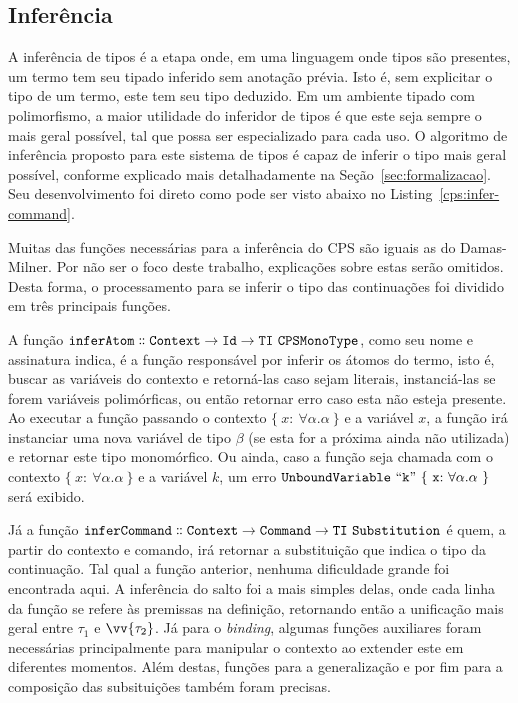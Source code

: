 \subsection{Inferência}\label{subsec:cps-inferer}
A inferência de tipos é a etapa onde, em uma linguagem onde tipos são presentes, um termo tem seu tipado inferido sem anotação prévia.
Isto é, sem explicitar o tipo de um termo, este tem seu tipo deduzido.
Em um ambiente tipado com polimorfismo, a maior utilidade do inferidor de tipos é que este seja sempre o mais geral possível, tal que possa ser especializado para cada uso.
O algoritmo de inferência proposto para este sistema de tipos é capaz de inferir o tipo mais geral possível, conforme explicado mais detalhadamente na Seção~\ref{sec:formalizacao}.
Seu desenvolvimento foi direto como pode ser visto abaixo no Listing~\ref{cps:infer-command}.


Muitas das funções necessárias para a inferência do CPS são iguais as do Damas-Milner.
Por não ser o foco deste trabalho, explicações sobre estas serão omitidos.
Desta forma, o processamento para se inferir o tipo das continuações foi dividido em três principais funções.

A função $\mathtt{inferAtom \dblcolon Context \to Id \to TI\ CPSMonoType}$, como seu nome e assinatura indica, é a função responsável por inferir os átomos do termo, isto é, buscar as variáveis do contexto e retorná-las caso sejam literais, instanciá-las se forem variáveis polimórficas, ou então retornar erro caso esta não esteja presente.
Ao executar a função passando o contexto $\{\ x{:}\ \forall\alpha.\alpha \ \}$ e a variável $x$, a função irá instanciar uma nova variável de tipo $\beta$ (se esta for a próxima ainda não utilizada) e retornar este tipo monomórfico.
Ou ainda, caso a função seja chamada com o contexto $\{\ x{:}\ \forall\alpha.\alpha \ \}$ e a variável $k$, um erro $\mathtt{UnboundVariable\ ``k"\ \{\ x{:}\ \forall\alpha.\alpha \ \}}$ será exibido.

Já a função $\mathtt{inferCommand \dblcolon Context \to Command \to TI\ Substitution}$ é quem, a partir do contexto e comando, irá retornar a substituição que indica o tipo da continuação.
Tal qual a função anterior, nenhuma dificuldade grande foi encontrada aqui.
A inferência do salto foi a mais simples delas, onde cada linha da função se refere às premissas na definição, retornando então a unificação mais geral entre $\tau_1$ e $\vv{\tau_2}$.
Já para o \textit{binding}, algumas funções auxiliares foram necessárias principalmente para manipular o contexto ao extender este em diferentes momentos.
Além destas, funções para a generalização e por fim para a composição das subsituições também foram precisas.

